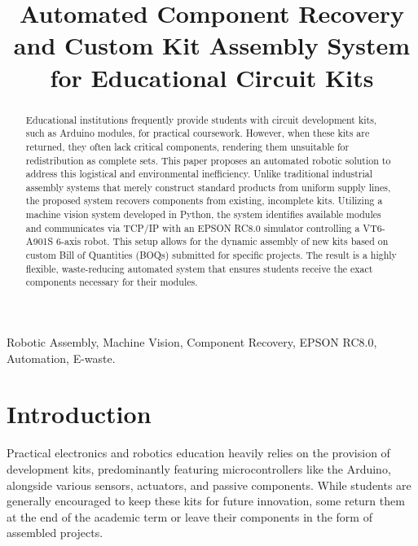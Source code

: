 \documentclass[conference]{IEEEtran}
\begin{document}
\title{Automated Component Recovery and Custom Kit Assembly System for Educational Circuit Kits\\}

\author{
\and
{}
}

\maketitle

\begin{abstract}
Educational institutions frequently provide students with circuit development kits, such as Arduino modules, for practical coursework. However, when these kits are returned, they often lack critical components, rendering them unsuitable for redistribution as complete sets. This paper proposes an automated robotic solution to address this logistical and environmental inefficiency. Unlike traditional industrial assembly systems that merely construct standard products from uniform supply lines, the proposed system recovers components from existing, incomplete kits. Utilizing a machine vision system developed in Python, the system identifies available modules and communicates via TCP/IP with an EPSON RC8.0 simulator controlling a VT6-A901S 6-axis robot. This setup allows for the dynamic assembly of new kits based on custom Bill of Quantities (BOQs) submitted for specific projects. The result is a highly flexible, waste-reducing automated system that ensures students receive the exact components necessary for their modules.
\end{abstract}

\begin{IEEEkeywords}
Robotic Assembly, Machine Vision, Component Recovery, EPSON RC8.0, Automation, E-waste.
\end{IEEEkeywords}

\section{Introduction}
Practical electronics and robotics education heavily relies on the provision of development kits, predominantly featuring microcontrollers like the Arduino, alongside various sensors, actuators, and passive components. While students are generally encouraged to keep these kits for future innovation, some return them at the end of the academic term or leave their components in the form of assembled projects.
\end{document}
